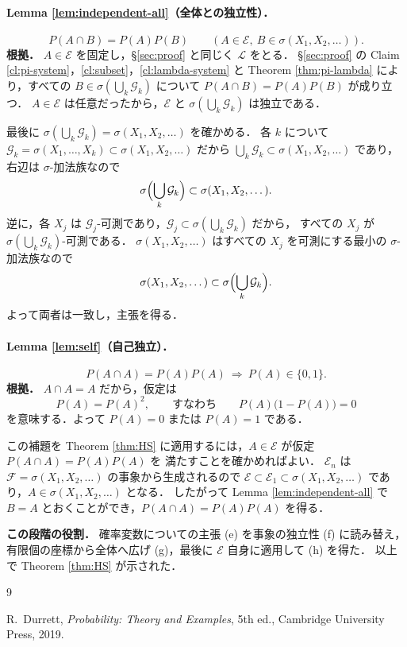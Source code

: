 \documentclass[a4paper,11pt,uplatex,dvipdfmx]{jsarticle}
\theoremstyle{plain}
\theoremstyle{definition}
\begin{document}
\paragraph{Lemma \ref{lem:independent-all}（全体との独立性）．}
\[
  P(A\cap B)=P(A)P(B)\qquad(A\in\mathcal{E},\ B\in\sigma(X_1,X_2,\dots)).
\]
\textbf{根拠．}
$A\in\mathcal{E}$ を固定し，\S\ref{sec:proof} と同じく $\mathcal{L}$ をとる．
\S\ref{sec:proof} の Claim \ref{cl:pi-system}，\ref{cl:subset}，\ref{cl:lambda-system} と
Theorem \ref{thm:pi-lambda} により，すべての $B\in\sigma(\bigcup_k\mathcal{G}_k)$ について $P(A\cap B)=P(A)P(B)$ が成り立つ．
$A\in\mathcal{E}$ は任意だったから，$\mathcal{E}$ と $\sigma(\bigcup_k\mathcal{G}_k)$ は独立である．

最後に $\sigma(\bigcup_k\mathcal{G}_k)=\sigma(X_1,X_2,\dots)$ を確かめる．
各 $k$ について $\mathcal{G}_k=\sigma(X_1,\dots,X_k)\subset\sigma(X_1,X_2,\dots)$ だから
$\bigcup_k\mathcal{G}_k\subset\sigma(X_1,X_2,\dots)$ であり，右辺は $\sigma$-加法族なので
\[
  \sigma\Bigl(\bigcup_k\mathcal{G}_k\Bigr)\subset\sigma(X_1,X_2,\dots).
\]
逆に，各 $X_j$ は $\mathcal{G}_j$-可測であり，$\mathcal{G}_j\subset\sigma(\bigcup_k\mathcal{G}_k)$ だから，
すべての $X_j$ が $\sigma(\bigcup_k\mathcal{G}_k)$-可測である．
$\sigma(X_1,X_2,\dots)$ はすべての $X_j$ を可測にする最小の $\sigma$-加法族なので
\[
  \sigma(X_1,X_2,\dots)\subset\sigma\Bigl(\bigcup_k\mathcal{G}_k\Bigr).
\]
よって両者は一致し，主張を得る．

\paragraph{Lemma \ref{lem:self}（自己独立）．}
\[
  P(A\cap A)=P(A)P(A)\ \Longrightarrow\ P(A)\in\{0,1\}.
\]
\textbf{根拠．}
$A\cap A=A$ だから，仮定は
\[
  P(A)=P(A)^2,\qquad\text{すなわち}\qquad P(A)\bigl(1-P(A)\bigr)=0
\]
を意味する．よって $P(A)=0$ または $P(A)=1$ である．

この補題を Theorem \ref{thm:HS} に適用するには，$A\in\mathcal{E}$ が仮定 $P(A\cap A)=P(A)P(A)$ を
満たすことを確かめればよい．
$\mathcal{E}_n$ は $\mathcal{F}=\sigma(X_1,X_2,\dots)$ の事象から生成されるので
$\mathcal{E}\subset\mathcal{E}_1\subset\sigma(X_1,X_2,\dots)$ であり，$A\in\sigma(X_1,X_2,\dots)$ となる．
したがって Lemma \ref{lem:independent-all} で $B=A$ とおくことができ，$P(A\cap A)=P(A)P(A)$ を得る．

\medskip\noindent\textbf{この段階の役割．}
確率変数についての主張 (e) を事象の独立性 (f) に読み替え，
有限個の座標から全体へ広げ (g)，最後に $\mathcal{E}$ 自身に適用して (h) を得た．
以上で Theorem \ref{thm:HS} が示された．

\begin{thebibliography}{9}
R.~Durrett,
\textit{Probability: Theory and Examples},
5th ed.,
Cambridge University Press, 2019.
\end{thebibliography}
\end{document}
